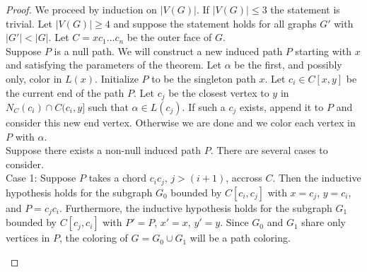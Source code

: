 \documentclass[11pt,letter]{article}
\begin{document}
\begin{proof}
We proceed by induction on $|V(G)|$. If $|V(G)|\le3$ the statement is trivial. Let $|V(G)|\ge4$ and suppose the
statement holds for all graphs $G'$ with $|G'|<|G|$. Let $C=xc_1\ldots c_{n}$ be the outer face of $G$.\\

\noindent Suppose $P$ is a null path. We will construct a new induced path $P$ starting with $x$ and
satisfying the parameters of the theorem. Let $\alpha$ be
the first, and possibly only, color in $L(x)$.
Initialize $P$ to be the singleton path $x$. Let $c_i\in C[x,y]$ be the current end of the path $P$.
Let $c_j$ be the closest vertex to $y$ in $N_C(c_i)\cap C(c_i,y]$ such that $\alpha\in L(c_j)$. If such a
$c_j$ exists, append it to $P$ and consider this new end vertex. Otherwise we are done and we color each
vertex in $P$ with $\alpha$.\\

\noindent Suppose there exists a non-null induced path $P$. There are several cases to consider.\\

\noindent Case 1: Suppose $P$ takes a chord $c_ic_j$,
$j>(i+1)$, accross $C$. Then the inductive hypothesis holds for the subgraph $G_0$
bounded by $C[c_i,c_j]$ with $x=c_j$, $y=c_i$, and $P=c_jc_i$. Furthermore, the inductive hypothesis
holds for the subgraph $G_1$ bounded by $C[c_j,c_i]$ with $P'=P$, $x'=x$, $y'=y$. Since $G_0$ and $G_1$
share only vertices in $P$, the coloring of $G=G_0\cup G_1$ will be a path coloring.\\

\begin{adjustwidth}{2em}{2em}
\begin{center}
\end{center}
\end{adjustwidth}
\end{proof}
\end{document}

